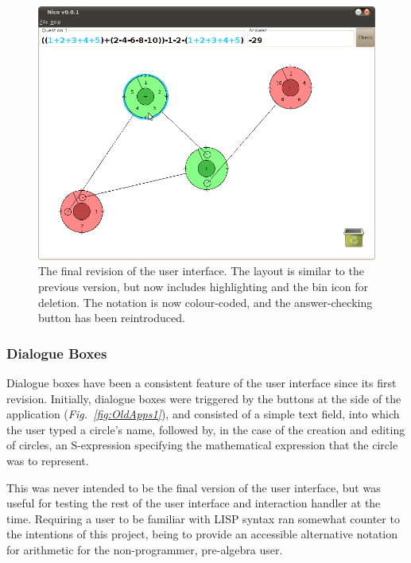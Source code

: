 \documentclass[12pt,twoside,notitlepage,xetex]{report}
\begin{document}
{\begin{center}
\begin{figure}[H]
\begin{center}
\includegraphics[width=\textwidth-4cm]{figs/nico_screen_new.png}
\end{center}
\caption{The final revision of the user interface.  The layout is similar to the previous version, but now includes highlighting and the bin icon for deletion.  The notation is now colour-coded, and the answer-checking button has been reintroduced.}
\label{fig:OldApps3}
\end{figure}
\end{center}

\subsubsection{Dialogue Boxes}

Dialogue boxes have been a consistent feature of the user interface since its first revision.  Initially, dialogue boxes were triggered by the buttons at the side of the application (\emph{Fig.~\ref{fig:OldApps1}}), and consisted of a simple text field, into which the user typed a circle's name, followed by, in the case of the creation and editing of circles, an S-expression specifying the mathematical expression that the circle was to represent.

This was never intended to be the final version of the user interface, but was useful for testing the rest of the user interface and interaction handler at the time.  Requiring a user to be familiar with LISP syntax ran somewhat counter to the intentions of this project, being to provide an accessible alternative notation for arithmetic for the non-programmer, pre-algebra user.

}
\end{document}
